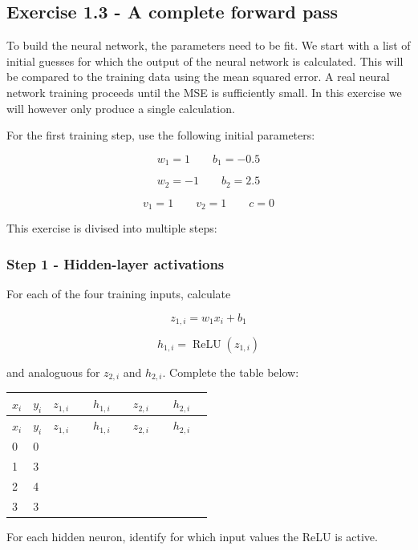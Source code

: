 \documentclass[10pt]{article}
\begin{document}
\subsection*{Exercise 1.3 - A complete forward pass}
To build the neural network, the parameters need to be fit. We start with a list of initial guesses for which the output of the neural network is calculated. This will be compared to the training data using the mean squared error. A real neural network training proceeds until the MSE is sufficiently small. In this exercise we will however only produce a single calculation.

For the first training step, use the following initial parameters:

\[
w_1=1
\qquad
b_1=-0.5
\]

\[
w_2=-1
\qquad
b_2=2.5
\]

\[
v_1=1
\qquad
v_2=1
\qquad
c=0
\]

This exercise is divised into multiple steps:

\subsubsection*{Step 1 - Hidden-layer activations}
For each of the four training inputs, calculate

\[
z_{1,i}=w_1x_i+b_1
\]

\[
h_{1,i}=\operatorname{ReLU}(z_{1,i})
\]

and analoguous for $z_{2,i}$ and $h_{2,i}$. Complete the table below:

\begingroup
\small
\setlength{\tabcolsep}{4pt}
\begin{longtable}{l|l|l|l|l|l}
$x_i$ & $y_i$ & $z_{1,i}$ & $h_{1,i}$ & $z_{2,i}$ & $h_{2,i}$ \\[1.5pt]
\hline
\endfirsthead
$x_i$ & $y_i$ & $z_{1,i}$ & $h_{1,i}$ & $z_{2,i}$ & $h_{2,i}$ \\[1.5pt]
\hline
\endhead
\rule{0pt}{2.4ex}0 & 0 &  $\phantom{-0.00}$ &  $\phantom{-0.00}$ &  $\phantom{-0.00}$ &  $\phantom{-0.00}$ \\[3pt]
\rule{0pt}{2.4ex}1 & 3 &  $\phantom{-0.00}$ &  $\phantom{-0.00}$ &  $\phantom{-0.00}$ &  $\phantom{-0.00}$ \\[3pt]
\rule{0pt}{2.4ex}2 & 4 &  $\phantom{-0.00}$ &  $\phantom{-0.00}$ &  $\phantom{-0.00}$ &  $\phantom{-0.00}$ \\[3pt]
\rule{0pt}{2.4ex}3 & 3 &  $\phantom{-0.00}$ &  $\phantom{-0.00}$ &  $\phantom{-0.00}$ &  $\phantom{-0.00}$ \\[3pt]
\end{longtable}
\endgroup
For each hidden neuron, identify for which input values the ReLU is active.
\end{document}
